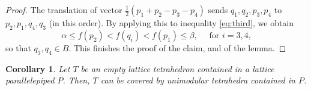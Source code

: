\documentclass{amsart}
\theoremstyle{plain}
\newtheorem{corollary}[theorem]{Corollary}
\theoremstyle{definition}
\newcommand{\R}{ \ensuremath{\mathbb{R}}}
\newcommand{\giulia}[1]{\todo[size=\tiny,color=blue!30]{#1 \\ \hfill --- G.}}
\begin{document}
\begin{proof}
The translation of vector $\frac12 (p_1+p_2-p_3-p_4)$ sends $q_1,q_2,p_3,p_4$ to $p_2,p_1,q_4,q_3$ (in this order). By applying this to inequality \eqref{eq:third}, we obtain
\[
\alpha \le f(p_2) < f(q_i) < f(p_1) \le \beta, \quad\text{ for $i=3,4$},
\]
so that $q_3,q_4 \in B$.
%
This finishes the proof of the claim, and of the lemma.
%
%
%
%
%
\end{proof}

\begin{corollary}
\label{coro:coverpara}
Let $T$ be an empty lattice tetrahedron contained in a lattice parallelepiped $P$. Then, $T$ can be covered by unimodular tetrahedra contained in $P$.
\end{corollary}
\end{document}
